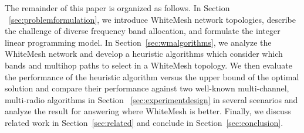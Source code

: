 The remainder of this paper is organized as follows. In Section
~\ref{sec:problemformulation}, we introduce WhiteMesh network 
topologies, describe the challenge of diverse frequency band 
allocation, and formulate the integer linear programming model. 
In Section~\ref{sec:wmalgorithms}, we analyze the WhiteMesh network
and develop a heuristic algorithms which consider which bands 
and multihop paths to select in a WhiteMesh topology.  We then 
evaluate the performance of the heuristic algorithm versus the 
upper bound of the optimal solution and compare their performance 
against two well-known multi-channel, multi-radio algorithms in Section
~\ref{sec:experimentdesign} in several scenarios and analyze the 
result for answering where WhiteMesh is better. Finally, we discuss 
related work in Section~\ref{sec:related} and conclude in Section~\ref{sec:conclusion}.






